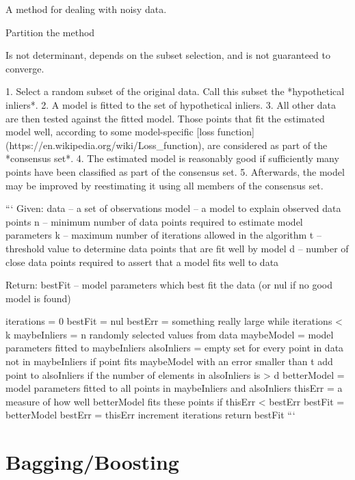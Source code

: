 {{A method for dealing with noisy data. 

Partition the method 

Is not determinant, depends on the subset selection, and is not guaranteed to converge.

1. Select a random subset of the original data. Call this subset the *hypothetical inliers*.
2. A model is fitted to the set of hypothetical inliers.
3. All other data are then tested against the fitted model. Those points that fit the estimated model well, according to some model-specific [loss function](https://en.wikipedia.org/wiki/Loss_function), are considered as part of the *consensus set*.
4. The estimated model is reasonably good if sufficiently many points have been classified as part of the consensus set.
5. Afterwards, the model may be improved by reestimating it using all members of the consensus set.

```
Given:
    data – a set of observations
    model – a model to explain observed data points
    n – minimum number of data points required to estimate model parameters
    k – maximum number of iterations allowed in the algorithm
    t – threshold value to determine data points that are fit well by model 
    d – number of close data points required to assert that a model fits well to data

Return:
    bestFit – model parameters which best fit the data (or nul if no good model is found)

iterations = 0
bestFit = nul
bestErr = something really large
while iterations < k {
    maybeInliers = n randomly selected values from data
    maybeModel = model parameters fitted to maybeInliers
    alsoInliers = empty set
    for every point in data not in maybeInliers {
        if point fits maybeModel with an error smaller than t
             add point to alsoInliers
    }
    if the number of elements in alsoInliers is > d {
        betterModel = model parameters fitted to all points in maybeInliers and alsoInliers
        thisErr = a measure of how well betterModel fits these points
        if thisErr < bestErr {
            bestFit = betterModel
            bestErr = thisErr
        }
    }
    increment iterations
}
return bestFit
```



\section{Bagging/Boosting}

}}
